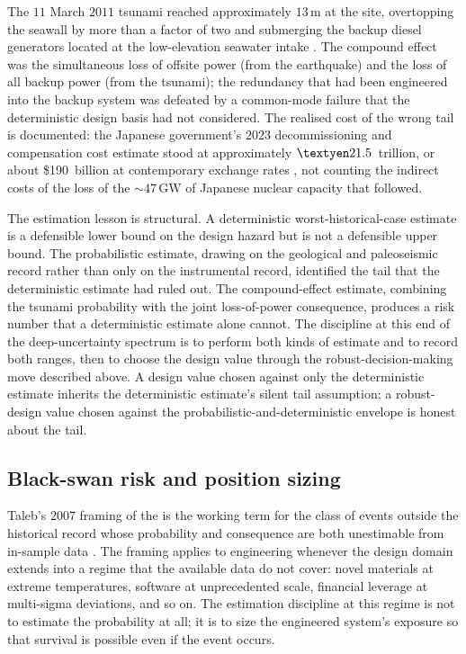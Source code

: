 The $11$ March $2011$ tsunami reached approximately $13 \,\si{\meter}$
at the site, overtopping the seawall by more than a factor of
two and submerging the backup diesel generators located at the
low-elevation seawater intake \cite{acc:tepco-fukushima-2012}.
The compound effect was the simultaneous loss of offsite power
(from the earthquake) and the loss of all backup power (from the
tsunami); the redundancy that had been engineered into the backup
system was defeated by a common-mode failure that the
deterministic design basis had not considered. The realised
cost of the wrong tail is documented: the Japanese government's
$2023$ decommissioning and compensation cost estimate stood at
approximately $\textyen 21.5$~trillion, or about \$190~billion at
contemporary exchange rates \cite{web:ch09t3-tepco-decommissioning-2023},
not counting the indirect costs of the loss of the
$\sim 47 \,\text{GW}$ of Japanese nuclear capacity that followed.

The estimation lesson is structural. A deterministic
worst-historical-case estimate is a defensible lower bound on
the design hazard but is not a defensible upper bound. The
probabilistic estimate, drawing on the geological and
paleoseismic record rather than only on the instrumental record,
identified the tail that the deterministic estimate had ruled
out. The compound-effect estimate, combining the tsunami
probability with the joint loss-of-power consequence, produces
a risk number that a deterministic estimate alone cannot. The
discipline at this end of the deep-uncertainty spectrum is to
perform both kinds of estimate and to record both ranges, then
to choose the design value through the robust-decision-making
move described above. A design value chosen against only the
deterministic estimate inherits the deterministic estimate's
silent tail assumption; a robust-design value chosen against
the probabilistic-and-deterministic envelope is honest about
the tail.

\subsection{Black-swan risk and position sizing}

Taleb's $2007$ framing of the  is the
working term for the class of events outside the historical
record whose probability and consequence are both
unestimable from in-sample data
\cite{text:ch09t3-taleb-2007}. The framing applies to
engineering whenever the design domain extends into a regime
that the available data do not cover: novel materials at
extreme temperatures, software at unprecedented scale,
financial leverage at multi-sigma deviations, and so on. The
estimation discipline at this regime is not to estimate the
probability at all; it is to size the engineered system's
exposure so that survival is possible even if the event
occurs.

